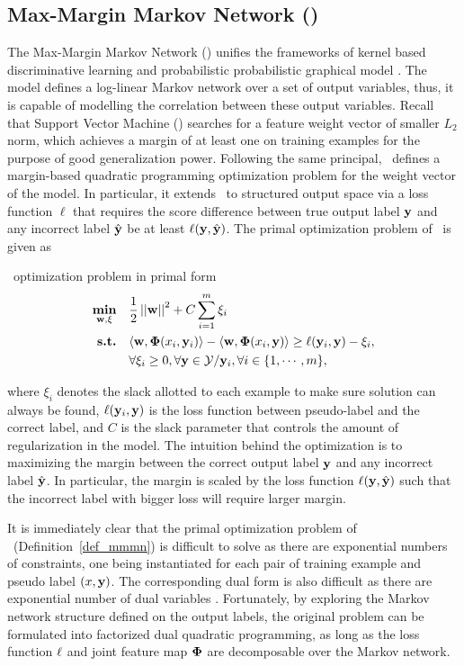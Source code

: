 { 


%
\subsection{Max-Margin Markov Network (\mmmn)}

The Max-Margin Markov Network (\mmmn) unifies the frameworks of kernel based discriminative learning and probabilistic probabilistic graphical model \citep{taskar04}.
The model defines a log-linear Markov network over a set of output variables, thus, it is capable of modelling the correlation between these output variables.
Recall that Support Vector Machine (\svm) searches for a feature weight vector of smaller $L_2$ norm, which achieves a margin of at least one on training examples for the purpose of good generalization power.
Following the same principal, \mmmn\ defines a margin-based quadratic programming optimization problem for the weight vector of the model.
In particular, it extends \svm\ to structured output space via a loss function $\ell$ that requires the score difference between true output label $\mathbf {y}$ and any incorrect label $\hat{\mathbf {y}}$ be at least $\mathbf {\ell}(\mathbf {y},\hat{\mathbf {y}})$.
The primal optimization problem of \mmmn\ is given as
\begin{definition}{\mmmn\ optimization problem in primal form}\label{def_mmmn}
	\begin{align*}
		\underset{\mathbf {w},\mathbf{\xi}}{\textbf{min}} & \quad\frac{1}{2}\left|\left| \mathbf {w} \right|\right|^2 + C\sum_{i=1}^{m}\xi_i \\
		\textbf{s.t.} & \quad\langle \mathbf {w}, \mathbf{\Phi}(x_i,\mathbf {y}_i) \rangle - \langle \mathbf {w}, \mathbf{\Phi}(x_i,\mathbf {y}) \rangle \ge \mathbf {\ell}(\mathbf {y}_i,\mathbf {y})-\xi_i,\\
		& \quad \forall \xi_i\ge0, \forall \mathbf {y}\in\mathcal{Y}/\mathbf {y}_i, \forall i\in\{1,\cdots,m\},
	\end{align*}
\end{definition}
where $\xi_i$ denotes the slack allotted to each example to make sure solution can always be found, $\mathbf {\ell}(\mathbf {y}_i,\mathbf {y})$ is the loss function between pseudo-label and the correct label, and $C$ is the slack parameter that controls the amount of regularization in the model.
The intuition behind the optimization is to maximizing the margin between the correct output label $\mathbf {y}$ and any incorrect label $\hat{\mathbf {y}}$.
In particular, the margin is scaled by the loss function $\mathbf {\ell}(\mathbf {y},\hat{\mathbf {y}})$ such that the incorrect label with bigger loss will require larger margin. 

It is immediately clear that the primal optimization problem of \mmmn\ (Definition~\ref{def_mmmn}) is difficult to solve as there are exponential numbers of constraints, one being instantiated for each pair of training example and pseudo label $(x,\mathbf {y})$.
The corresponding dual form is also difficult as there are exponential number of dual variables \cite[p.~4]{taskar04}.
Fortunately, by exploring the Markov network structure defined on the output labels, the original problem can be formulated into factorized dual quadratic programming, as long as the loss function $\mathbf {\ell}$ and joint feature map $\mathbf{\Phi}$ are decomposable over the Markov network.

}
